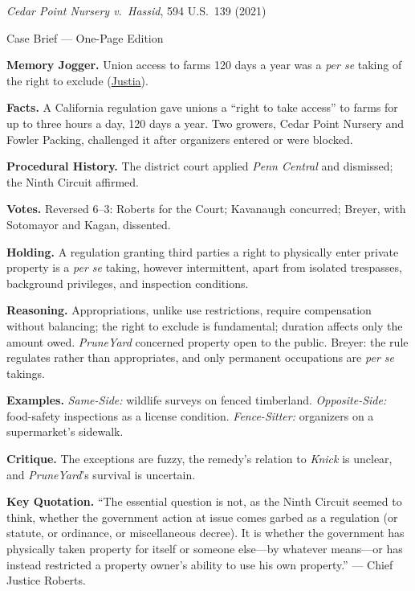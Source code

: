 \documentclass[12pt]{article}
\begin{document}
\begin{center}
{\Large \textit{Cedar Point Nursery v.\ Hassid}, 594 U.S.\ 139 (2021)\par}
\vspace{0.3em}
{\normalsize Case Brief --- One-Page Edition\par}
\end{center}

\textbf{Memory Jogger.} Union access to farms 120 days a year was a \emph{per se} taking of the right to exclude (\href{https://supreme.justia.com/cases/federal/us/594/20-107/}{Justia}).

\textbf{Facts.} A California regulation gave unions a ``right to take access'' to farms for up to three hours a day, 120 days a year. Two growers, Cedar Point Nursery and Fowler Packing, challenged it after organizers entered or were blocked.

\textbf{Procedural History.} The district court applied \textit{Penn Central} and dismissed; the Ninth Circuit affirmed.

\textbf{Votes.} Reversed 6--3: Roberts for the Court; Kavanaugh concurred; Breyer, with Sotomayor and Kagan, dissented.

\textbf{Holding.} A regulation granting third parties a right to physically enter private property is a \emph{per se} taking, however intermittent, apart from isolated trespasses, background privileges, and inspection conditions.

\textbf{Reasoning.} Appropriations, unlike use restrictions, require compensation without balancing; the right to exclude is fundamental; duration affects only the amount owed. \textit{PruneYard} concerned property open to the public. Breyer: the rule regulates rather than appropriates, and only permanent occupations are \emph{per se} takings.

\textbf{Examples.} \emph{Same-Side:} wildlife surveys on fenced timberland. \emph{Opposite-Side:} food-safety inspections as a license condition. \emph{Fence-Sitter:} organizers on a supermarket's sidewalk.

\textbf{Critique.} The exceptions are fuzzy, the remedy's relation to \textit{Knick} is unclear, and \textit{PruneYard}'s survival is uncertain.

\textbf{Key Quotation.} ``The essential question is not, as the Ninth Circuit seemed to think, whether the government action at issue comes garbed as a regulation (or statute, or ordinance, or miscellaneous decree). It is whether the government has physically taken property for itself or someone else---by whatever means---or has instead restricted a property owner's ability to use his own property.'' --- Chief Justice Roberts.
\end{document}
